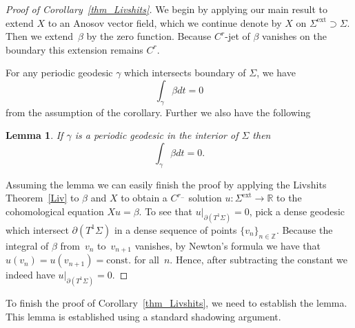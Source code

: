 \documentclass[JEP,XML,SOM,Unicode,NoFloatCountersInSection]{cedram}
\newcommand{\ext}{\mathrm{ext}}
\newtheorem{lemma}[theorem]{Lemma}
\theoremstyle{definition}
\renewcommand{\>}{{\rangle}}
\newcommand{\<}{{\langle}}
\begin{document}
\begin{proof}[Proof of Corollary~\ref{thm_Livshits}]
We begin by applying our main result to extend $X$ to an Anosov vector field, which we continue denote by $X$ on $\Sigma^{\ext}\supset\Sigma$. Then we extend~$\beta$ by the zero function. Because $C^r$-jet of $\beta$ vanishes on the boundary this extension remains $C^r$.

For any periodic geodesic $\gamma$ which intersects boundary of $\Sigma$, we have
\[
\int_\gamma \beta dt=0
\]
from the assumption of the corollary. Further we also have the following
\begin{lemma}
\label{lemma_aprx}
If $\gamma$ is a periodic geodesic in the interior of $\Sigma$ then
\[
\int_\gamma \beta dt=0.
\]
\end{lemma}

Assuming the lemma we can easily finish the proof by applying the Livshits Theorem~\ref{Liv} to $\beta$ and $X$ to obtain a $C^{r_-}$ solution $u\colon\Sigma^{\ext}\to\mathbb R$ to the cohomological equation $Xu=\beta$.
To see that $u|_{\partial(T^1\Sigma)}=0$, pick a dense geodesic which intersect $\partial(T^1\Sigma)$ in a dense sequence of points $\{v_n\}_{n\in\mathbb Z}$. Because the integral of $\beta$ from~$v_n$ to~$v_{n+1}$ vanishes, by Newton's formula we have that $u(v_n)=u(v_{n+1})=\text{const.}$ for all~$n$. Hence, after subtracting the constant we indeed have $u|_{\partial(T^1\Sigma)}=0$.
\end{proof}
To finish the proof of Corollary~\ref{thm_Livshits}, we need to establish the lemma. This lemma is established using a standard shadowing argument.
\end{document}
